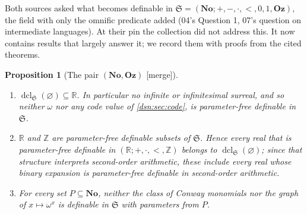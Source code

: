 \documentclass[11pt,a4paper]{article}
\numberwithin{equation}{section}
\newtheorem{proposition}[proposition]{Proposition}
\theoremstyle{definition}
\theoremstyle{remark}
\newcommand{\No}{\mathbf{No}}
\newcommand{\Oz}{\mathbf{Oz}}
\newcommand{\Z}{\mathbb Z}
\newcommand{\R}{\mathbb R}
\newcommand{\dcl}{\operatorname{dcl}}
\newcommand{\mergetag}{\textup{\textsf{\small[merge]}}}
\begin{document}
Both sources asked what becomes definable in
$\mathfrak S=(\No;+,-,\cdot,<,0,1,\Oz)$, the field with only the omnific
predicate added (04's Question 1, 07's question on intermediate
languages). At their pin the collection did not address this. It now
contains results that largely answer it; we record them with proofs from
the cited theorems.

\begin{proposition}[The pair $(\No,\Oz)$ \mergetag]\label{dsn:prop:pair}
\leavevmode
\begin{enumerate}[label=\textup{(\roman*)}]
\item $\dcl_{\mathfrak S}(\varnothing)\subseteq\R$. In particular no
infinite or infinitesimal surreal, and so neither $\omega$ nor any code
value of \cref{dsn:sec:code}, is parameter-free definable in $\mathfrak S$.
\item $\R$ and $\Z$ are parameter-free definable subsets of $\mathfrak S$.
Hence every real that is parameter-free definable in
$(\R;+,\cdot,<,\Z)$ belongs to $\dcl_{\mathfrak S}(\varnothing)$; since
that structure interprets second-order arithmetic, these include every real
whose binary expansion is parameter-free definable in second-order
arithmetic.
\item For every set $P\subseteq\No$, neither the class of Conway monomials
nor the graph of $x\mapsto\omega^x$ is definable in $\mathfrak S$ with
parameters from $P$.
\end{enumerate}
\end{proposition}
\end{document}
